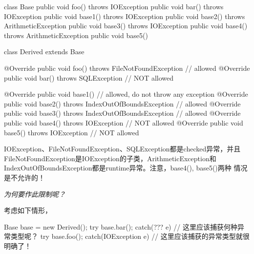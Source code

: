 \begin{javacode}
class Base {
  public void foo() throws IOException { }
  public void bar() throws IOException { }
  public void base1() throws IOException { }
  public void base2() throws ArithmeticException { }
  public void base3() throws IOException { }
  public void base4() throws ArithmeticException { }
  public void base5() { }
}

class Derived extends Base {
  @Override
  public void foo() throws FileNotFoundException { } // allowed
  @Override
  public void bar() throws SQLException { } // NOT allowed

  @Override
  public void base1() { } // allowed, do not throw any exception
  @Override
  public void base2() throws IndexOutOfBoundsException { } // allowed
  @Override
  public void base3() throws IndexOutOfBoundsException { } // allowed
  @Override
  public void base4() throws IOException { } // NOT allowed
  @Override
  public void base5() throws IOException { } // NOT allowed
}
\end{javacode}

IOException、FileNotFoundException、SQLException都是checked异常，并且
FileNotFound\-Exception是IOException的子类，ArithmeticException和
IndexOutOfBoundsException都是runtime异常。注意，base4(), base5()两种
情况是不允许的！

\emph{为何要作此限制呢？}

考虑如下情形，

\begin{javacode}
Base base = new Derived();
try {
  base.bar();
} catch(??? e) {
  // 这里应该捕获何种异常类型呢？
}
try {
  base.foo();
} catch(IOException e) {
  // 这里应该捕获的异常类型就很明确了！
}
\end{javacode}
